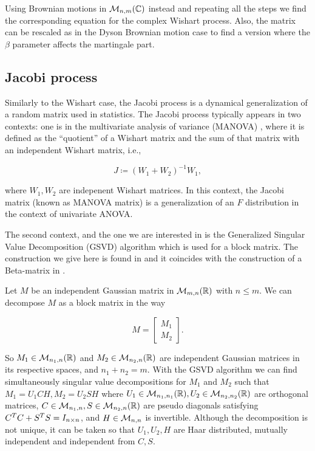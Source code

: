 Using Brownian motions in $\mathcal M_{n,m}(\mathbb C)$ instead and repeating all the steps we find the corresponding equation for the complex Wishart process. Also, the matrix can be rescaled as in the Dyson Brownian motion case to find a version where the $\beta$ parameter affects the martingale part.

\subsection{Jacobi process}

Similarly to the Wishart case, the Jacobi process is a dynamical generalization of a random matrix used in statistics. The Jacobi process typically appears in two contexts: one is in the multivariate analysis of variance (MANOVA) \cite{book:multivariate_statistics}, where it is defined as the “quotient” of a Wishart matrix and the sum of that matrix with an independent Wishart matrix, i.e.,

\begin{equation*}
    J \coloneqq (W_1 + W_2)^{-1}W_1,
\end{equation*}

\noindent where $W_1, W_2$ are indepenent Wishart matrices. In this context, the Jacobi matrix (known as MANOVA matrix) is a generalization of an $F$ distribution in the context of univariate ANOVA.

The second context, and the one we are interested in is the Generalized Singular Value Decomposition (GSVD) algorithm \cite{article:GSVD_van_loan} which is used for a block matrix. The construction we give here is found in \cite{article:marcus_finite_free_point_processes} and it coincides with the construction of a Beta-matrix in \cite{doumerc2005matrices}. 

Let $M$ be an independent Gaussian matrix in $\mathcal M_{m,n}(\mathbb R)$ with $n \le m$. We can decompose $M$ as a block matrix in the way

\begin{equation*}
    M = \begin{bmatrix} M_1 \\ M_2 \end{bmatrix}.
\end{equation*}

So $M_1 \in \mathcal M_{n_1,n}(\mathbb R)$ and $M_2 \in \mathcal M_{n_2,n}(\mathbb R)$ are independent Gaussian matrices in its respective spaces, and $n_1 + n_2 = m$. With the GSVD algorithm we can find simultaneously singular value decompositions for $M_1$ and $M_2$ such that $M_1 = U_1 CH, M_2 = U_2 S H$ where $U_1 \in \mathcal M_{n_1,n_1}(\mathbb R), U_2 \in \mathcal M_{n_2,n_2}(\mathbb R)$ are orthogonal matrices, $C\in \mathcal M_{n_1,n}, S \in \mathcal M_{n_2,n}(\mathbb R)$ are pseudo diagonals satisfying $C^TC + S^TS = I_{n\times n}$, and $H \in \mathcal M_{n,n}$ is invertible. Although the decomposition is not unique, it can be taken so that $U_1,U_2,H$ are Haar distributed, mutually independent and independent from $C,S$. 

